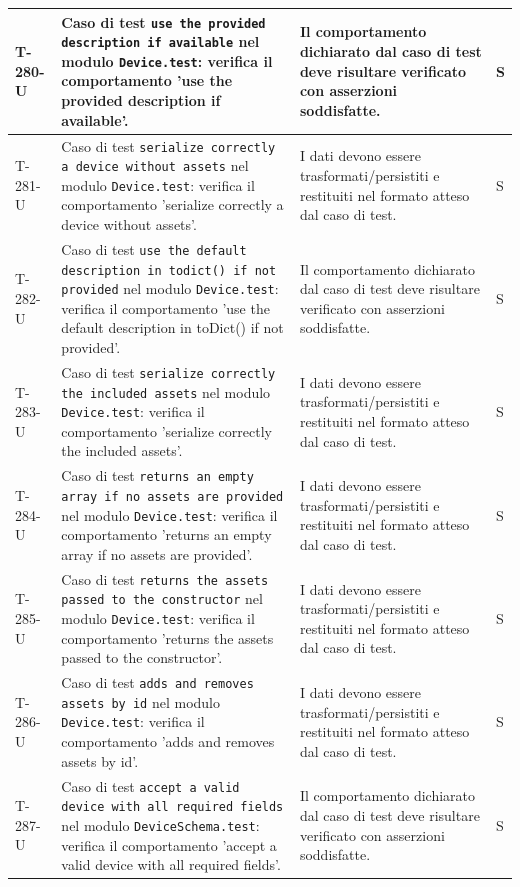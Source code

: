 \documentclass[a4paper,12pt]{article}
\begin{document}
{{\begin{longtable}{|>{\RaggedRight\arraybackslash}p{1.55cm}|>{\RaggedRight\arraybackslash}p{8.0cm}|>{\RaggedRight\arraybackslash}p{4.6cm}|>{\RaggedRight\arraybackslash}p{1.2cm}|}
        \hline
        T-280-U & Caso di test \texttt{use the provided description if available} nel modulo \texttt{Device.test}: verifica il comportamento 'use the provided description if available'. & Il comportamento dichiarato dal caso di test deve risultare verificato con asserzioni soddisfatte. & S \\
        \hline
        T-281-U & Caso di test \texttt{serialize correctly a device without assets} nel modulo \texttt{Device.test}: verifica il comportamento 'serialize correctly a device without assets'. & I dati devono essere trasformati/persistiti e restituiti nel formato atteso dal caso di test. & S \\
        \hline
        T-282-U & Caso di test \texttt{use the default description in todict() if not provided} nel modulo \texttt{Device.test}: verifica il comportamento 'use the default description in toDict() if not provided'. & Il comportamento dichiarato dal caso di test deve risultare verificato con asserzioni soddisfatte. & S \\
        \hline
        T-283-U & Caso di test \texttt{serialize correctly the included assets} nel modulo \texttt{Device.test}: verifica il comportamento 'serialize correctly the included assets'. & I dati devono essere trasformati/persistiti e restituiti nel formato atteso dal caso di test. & S \\
        \hline
        T-284-U & Caso di test \texttt{returns an empty array if no assets are provided} nel modulo \texttt{Device.test}: verifica il comportamento 'returns an empty array if no assets are provided'. & I dati devono essere trasformati/persistiti e restituiti nel formato atteso dal caso di test. & S \\
        \hline
        T-285-U & Caso di test \texttt{returns the assets passed to the constructor} nel modulo \texttt{Device.test}: verifica il comportamento 'returns the assets passed to the constructor'. & I dati devono essere trasformati/persistiti e restituiti nel formato atteso dal caso di test. & S \\
        \hline
        T-286-U & Caso di test \texttt{adds and removes assets by id} nel modulo \texttt{Device.test}: verifica il comportamento 'adds and removes assets by id'. & I dati devono essere trasformati/persistiti e restituiti nel formato atteso dal caso di test. & S \\
        \hline
        T-287-U & Caso di test \texttt{accept a valid device with all required fields} nel modulo \texttt{DeviceSchema.test}: verifica il comportamento 'accept a valid device with all required fields'. & Il comportamento dichiarato dal caso di test deve risultare verificato con asserzioni soddisfatte. & S \\

\end{longtable}}}
\end{document}
